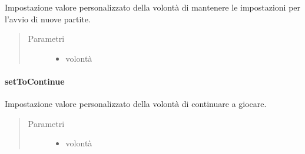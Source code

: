 \documentclass[letterpaper,10pt,italian,openany,oneside]{sphinxmanual}
\begin{document}
\begin{fulllineitems}
\label{\detokenize{source/it/unicam/cs/pa/mastermind/gamecore/StartupSettings:it.unicam.cs.pa.mastermind.gamecore.StartupSettings.setKeepMatchStartSettings(boolean)}}
Impostazione valore personalizzato della volontà di mantenere le impostazioni per l’avvio di nuove partite.
\begin{quote}\begin{description}
\item[{Parametri}] \leavevmode\begin{itemize}
\item {} 
 \textendash{} volontà

\end{itemize}

\end{description}\end{quote}

\end{fulllineitems}



\paragraph{setToContinue}
\label{\detokenize{source/it/unicam/cs/pa/mastermind/gamecore/StartupSettings:settocontinue}}

\begin{fulllineitems}
\label{\detokenize{source/it/unicam/cs/pa/mastermind/gamecore/StartupSettings:it.unicam.cs.pa.mastermind.gamecore.StartupSettings.setToContinue(boolean)}}
Impostazione valore personalizzato della volontà di continuare a giocare.
\begin{quote}\begin{description}
\item[{Parametri}] \leavevmode\begin{itemize}
\item {} 
 \textendash{} volontà

\end{itemize}

\end{description}\end{quote}

\end{fulllineitems}
\end{document}
